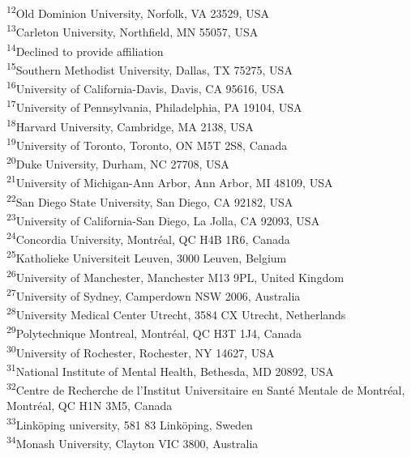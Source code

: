 \documentclass[fleqn,10pt,inline]{wlscirep}
\begin{document}
\hfill \break
\textsuperscript{12}Old Dominion University, Norfolk, VA 23529, USA\\
\textsuperscript{13}Carleton University, Northfield, MN 55057, USA\\
\textsuperscript{14}Declined to provide affiliation\\
\textsuperscript{15}Southern Methodist University, Dallas, TX 75275, USA\\
\textsuperscript{16}University of California-Davis, Davis, CA 95616, USA\\
\textsuperscript{17}University of Pennsylvania, Philadelphia, PA 19104, USA\\
\textsuperscript{18}Harvard University, Cambridge, MA 2138, USA\\
\textsuperscript{19}University of Toronto, Toronto, ON M5T 2S8, Canada\\
\textsuperscript{20}Duke University, Durham, NC 27708, USA\\
\textsuperscript{21}University of Michigan-Ann Arbor, Ann Arbor, MI 48109, USA\\
\textsuperscript{22}San Diego State University, San Diego, CA 92182, USA\\
\textsuperscript{23}University of California-San Diego, La Jolla, CA 92093, USA\\
\textsuperscript{24}Concordia University, Montréal, QC H4B 1R6, Canada\\
\textsuperscript{25}Katholieke Universiteit Leuven, 3000 Leuven, Belgium\\
\textsuperscript{26}University of Manchester, Manchester M13 9PL, United Kingdom\\
\textsuperscript{27}University of Sydney, Camperdown NSW 2006, Australia\\
\textsuperscript{28}University Medical Center Utrecht, 3584 CX Utrecht, Netherlands\\
\textsuperscript{29}Polytechnique Montreal, Montréal, QC H3T 1J4, Canada\\
\textsuperscript{30}University of Rochester, Rochester, NY 14627, USA\\
\textsuperscript{31}National Institute of Mental Health, Bethesda, MD 20892, USA\\
\textsuperscript{32}Centre de Recherche de l'Institut Universitaire en Santé Mentale de Montréal, Montréal, QC H1N 3M5, Canada\\
\textsuperscript{33}Linköping university, 581 83 Linköping, Sweden\\
\textsuperscript{34}Monash University, Clayton VIC 3800, Australia\\
\end{document}
